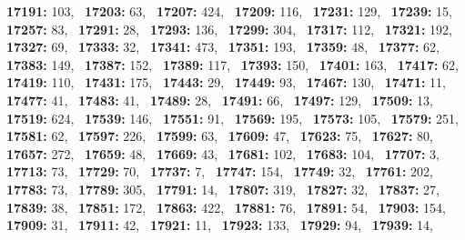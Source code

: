 \textbf{17191:} 103,\allowbreak~ 
\textbf{17203:} 63,\allowbreak~ 
\textbf{17207:} 424,\allowbreak~ 
\textbf{17209:} 116,\allowbreak~ 
\textbf{17231:} 129,\allowbreak~ 
\textbf{17239:} 15,\allowbreak~ 
\textbf{17257:} 83,\allowbreak~ 
\textbf{17291:} 28,\allowbreak~ 
\textbf{17293:} 136,\allowbreak~ 
\textbf{17299:} 304,\allowbreak~ 
\textbf{17317:} 112,\allowbreak~ 
\textbf{17321:} 192,\allowbreak~ 
\textbf{17327:} 69,\allowbreak~ 
\textbf{17333:} 32,\allowbreak~ 
\textbf{17341:} 473,\allowbreak~ 
\textbf{17351:} 193,\allowbreak~ 
\textbf{17359:} 48,\allowbreak~ 
\textbf{17377:} 62,\allowbreak~ 
\textbf{17383:} 149,\allowbreak~ 
\textbf{17387:} 152,\allowbreak~ 
\textbf{17389:} 117,\allowbreak~ 
\textbf{17393:} 150,\allowbreak~ 
\textbf{17401:} 163,\allowbreak~ 
\textbf{17417:} 62,\allowbreak~ 
\textbf{17419:} 110,\allowbreak~ 
\textbf{17431:} 175,\allowbreak~ 
\textbf{17443:} 29,\allowbreak~ 
\textbf{17449:} 93,\allowbreak~ 
\textbf{17467:} 130,\allowbreak~ 
\textbf{17471:} 11,\allowbreak~ 
\textbf{17477:} 41,\allowbreak~ 
\textbf{17483:} 41,\allowbreak~ 
\textbf{17489:} 28,\allowbreak~ 
\textbf{17491:} 66,\allowbreak~ 
\textbf{17497:} 129,\allowbreak~ 
\textbf{17509:} 13,\allowbreak~ 
\textbf{17519:} 624,\allowbreak~ 
\textbf{17539:} 146,\allowbreak~ 
\textbf{17551:} 91,\allowbreak~ 
\textbf{17569:} 195,\allowbreak~ 
\textbf{17573:} 105,\allowbreak~ 
\textbf{17579:} 251,\allowbreak~ 
\textbf{17581:} 62,\allowbreak~ 
\textbf{17597:} 226,\allowbreak~ 
\textbf{17599:} 63,\allowbreak~ 
\textbf{17609:} 47,\allowbreak~ 
\textbf{17623:} 75,\allowbreak~ 
\textbf{17627:} 80,\allowbreak~ 
\textbf{17657:} 272,\allowbreak~ 
\textbf{17659:} 48,\allowbreak~ 
\textbf{17669:} 43,\allowbreak~ 
\textbf{17681:} 102,\allowbreak~ 
\textbf{17683:} 104,\allowbreak~ 
\textbf{17707:} 3,\allowbreak~ 
\textbf{17713:} 73,\allowbreak~ 
\textbf{17729:} 70,\allowbreak~ 
\textbf{17737:} 7,\allowbreak~ 
\textbf{17747:} 154,\allowbreak~ 
\textbf{17749:} 32,\allowbreak~ 
\textbf{17761:} 202,\allowbreak~ 
\textbf{17783:} 73,\allowbreak~ 
\textbf{17789:} 305,\allowbreak~ 
\textbf{17791:} 14,\allowbreak~ 
\textbf{17807:} 319,\allowbreak~ 
\textbf{17827:} 32,\allowbreak~ 
\textbf{17837:} 27,\allowbreak~ 
\textbf{17839:} 38,\allowbreak~ 
\textbf{17851:} 172,\allowbreak~ 
\textbf{17863:} 422,\allowbreak~ 
\textbf{17881:} 76,\allowbreak~ 
\textbf{17891:} 54,\allowbreak~ 
\textbf{17903:} 154,\allowbreak~ 
\textbf{17909:} 31,\allowbreak~ 
\textbf{17911:} 42,\allowbreak~ 
\textbf{17921:} 11,\allowbreak~ 
\textbf{17923:} 133,\allowbreak~ 
\textbf{17929:} 94,\allowbreak~ 
\textbf{17939:} 14,\allowbreak~ 
